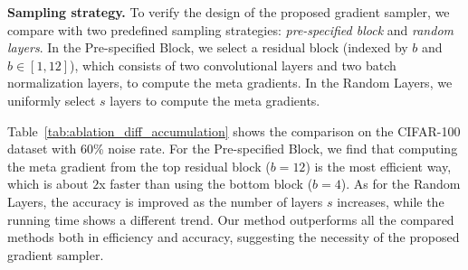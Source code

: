 \documentclass[final]{cvpr}
\begin{document}
\textbf{Sampling strategy.} To verify the design of the proposed gradient sampler, we compare with two predefined sampling strategies: \textit{pre-specified block} and \textit{random layers}. In the Pre-specified Block, we select a residual block (indexed by $b$ and $b\in[1, 12]$), which consists of two convolutional layers and two batch normalization layers, to compute the meta gradients. In the Random Layers, we uniformly select $s$ layers to compute the meta gradients.

Table~\ref{tab:ablation_diff_accumulation} shows the comparison on the CIFAR-100 dataset with 60\% noise rate. For the Pre-specified Block, we find that computing the meta gradient from the top residual block ($b=12$) is the most efficient way, which is about $2$x faster than using the bottom block ($b=4$). 
As for the Random Layers, the accuracy is improved as the number of layers $s$ increases, while the running time shows a different trend.
Our method outperforms all the compared methods both in efficiency and accuracy, suggesting the necessity of the proposed gradient sampler. 
\end{document}
